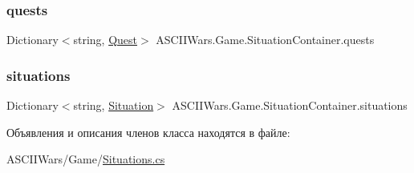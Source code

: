 \subsubsection{\texorpdfstring{quests}{quests}}
{\footnotesize\ttfamily Dictionary$<$string, \hyperlink{class_a_s_c_i_i_wars_1_1_game_1_1_quest}{Quest}$>$ A\+S\+C\+I\+I\+Wars.\+Game.\+Situation\+Container.\+quests}

\hypertarget{class_a_s_c_i_i_wars_1_1_game_1_1_situation_container_a24a982285b5782ecee43e98205d056c1}{}\label{class_a_s_c_i_i_wars_1_1_game_1_1_situation_container_a24a982285b5782ecee43e98205d056c1} 
\subsubsection{\texorpdfstring{situations}{situations}}
{\footnotesize\ttfamily Dictionary$<$string, \hyperlink{class_a_s_c_i_i_wars_1_1_game_1_1_situation}{Situation}$>$ A\+S\+C\+I\+I\+Wars.\+Game.\+Situation\+Container.\+situations}



Объявления и описания членов класса находятся в файле\+:\begin{DoxyCompactItemize}
\item 
A\+S\+C\+I\+I\+Wars/\+Game/\hyperlink{_situations_8cs}{Situations.\+cs}\end{DoxyCompactItemize}
